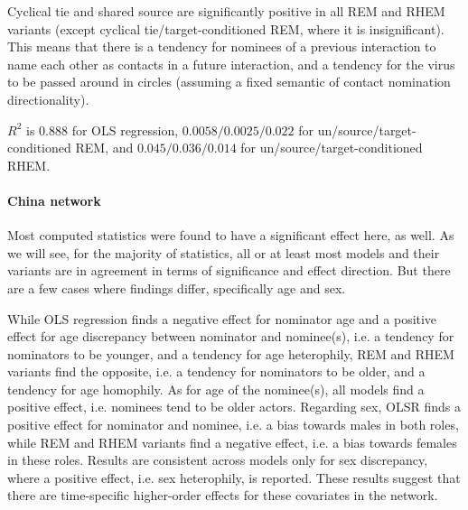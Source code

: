 Cyclical tie and shared source are significantly positive in all REM and RHEM variants (except cyclical tie/target-conditioned REM, where it is insignificant). This means that there is a tendency for nominees of a previous interaction to name each other as contacts in a future interaction, and a tendency for the virus to be passed around in circles (assuming a fixed semantic of contact nomination directionality).

$R^2$ is $0.888$ for OLS regression, $0.0058/0.0025/0.022$ for un/source/target-conditioned REM, and $0.045/0.036/0.014$ for un/source/target-conditioned RHEM.

\paragraph{China network} Most computed statistics were found to have a significant effect here, as well. As we will see, for the majority of statistics, all or at least most models and their variants are in agreement in terms of significance and effect direction. But there are a few cases where findings differ, specifically age and sex. 

While OLS regression finds a negative effect for nominator age and a positive effect for age discrepancy between nominator and nominee(s), i.e. a tendency for nominators to be younger, and a tendency for age heterophily, REM and RHEM variants find the opposite, i.e. a tendency for nominators to be older, and a tendency for age homophily. As for age of the nominee(s), all models find a positive effect, i.e. nominees tend to be older actors. Regarding sex, OLSR finds a positive effect for nominator and nominee, i.e. a bias towards males in both roles, while REM and RHEM variants find a negative effect, i.e. a bias towards females in these roles. Results are consistent across models only for sex discrepancy, where a positive effect, i.e. sex heterophily, is reported. These results suggest that there are time-specific higher-order effects for these covariates in the network.


